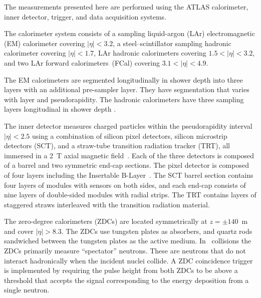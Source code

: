 

The measurements presented here are performed using the ATLAS calorimeter, inner detector, trigger, and data acquisition systems.


The calorimeter system consists of a sampling liquid-argon (LAr) electromagnetic (EM) calorimeter covering $|\eta|<3.2$, a steel--scintillator sampling hadronic calorimeter covering $|\eta| <1.7$, LAr hadronic calorimeters covering $1.5 < |\eta| < 3.2$, and two LAr forward calorimeters~(FCal) covering $3.1 < |\eta| < 4.9$.


The EM calorimeters are segmented longitudinally in shower depth into three layers with an additional pre-sampler layer.
They have segmentation that varies with layer and pseudorapidity.
The hadronic calorimeters have three sampling layers longitudinal in shower depth \cite{Aad:2008zzm}.


The inner detector measures charged particles within the pseudorapidity interval $|\eta|<2.5$ using a combination of silicon pixel detectors, silicon microstrip detectors (SCT), and a straw-tube transition radiation tracker (TRT), all immersed in a 2~T axial magnetic field~\cite{Aad:2008zzm}.
Each of the three detectors is composed of a barrel and two symmetric end-cap sections.
The pixel detector is composed of four layers including the Insertable B-Layer~\cite{ibl1,ibl2}.
The SCT barrel section contains four layers of modules with sensors on both sides, and each end-cap consists of nine layers of double-sided modules with radial strips.
The TRT contains layers of staggered straws interleaved with the transition radiation material.


The zero-degree calorimeters (ZDCs) are located symmetrically at $z = \pm140$~m and cover $|\eta| > 8.3$.
The ZDCs use tungsten plates as absorbers, and quartz rods sandwiched between the tungsten plates as the active medium.
In \PbPb\ collisions the ZDCs primarily measure ``spectator'' neutrons.
These are neutrons that do not interact hadronically when the incident nuclei collide.
A ZDC coincidence trigger is implemented by requiring the pulse height from both ZDCs to be above a threshold that accepts the signal corresponding to the energy deposition from a single neutron.


